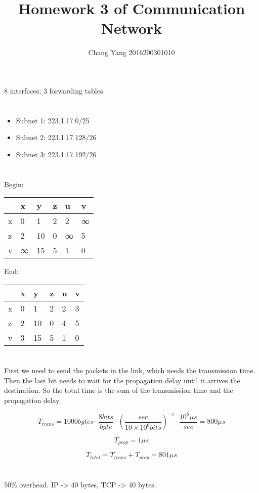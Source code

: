 \documentclass[]{article}
\title{Homework 3 of Communication Network}
\author{Chang Yang 2016200301010}
\begin{document}
\maketitle

\section{}
8 interfaces; 3 forwarding tables.

\section{}
\begin{itemize}
  \item Subnet 1: 223.1.17.0/25
  \item Subnet 2: 223.1.17.128/26
  \item Subnet 3: 223.1.17.192/26
\end{itemize}

\section{}
Begin:
\begin{center}
  \begin{tabular}{|l|l|l|l|l|l|}
  \hline
    & x & y  & z & u & v \\ \hline
  x & 0 & 1  & 2 & 2 & ∞ \\ \hline
  z & 2 & 10 & 0 & ∞ & 5 \\ \hline
  v & ∞ & 15 & 5 & 1 & 0 \\ \hline
  \end{tabular}
\end{center}
End:
\begin{center}
  \begin{tabular}{|l|l|l|l|l|l|}
  \hline
    & x & y  & z & u & v \\ \hline
  x & 0 & 1  & 2 & 2 & 3 \\ \hline
  z & 2 & 10 & 0 & 4 & 5 \\ \hline
  v & 3 & 15 & 5 & 1 & 0 \\ \hline
  \end{tabular}
\end{center}

\section{}
First we need to send the packets in the link, which needs the transmission
time. Then the last bit needs to wait for the propagation delay until it
arrives the destination. So the total time is the sum of the transmission
time and the propagation delay.

$$ T_{trans} = 1000 bytes \cdot \frac{8 bits}{byte}
\cdot (\frac{sec}{10 \times 10^6 bits})^{-1} \cdot
\frac{10^6 \mu s}{sec} = 800 \mu s $$

$$ T_{prop} = 1 \mu s $$

$$ T_{total} = T_{trans} + T_{prop} = 801 \mu s $$

\section{}
50\% overhead.
IP -­> 40 bytes, TCP -­> 40 bytes.
\end{document}
